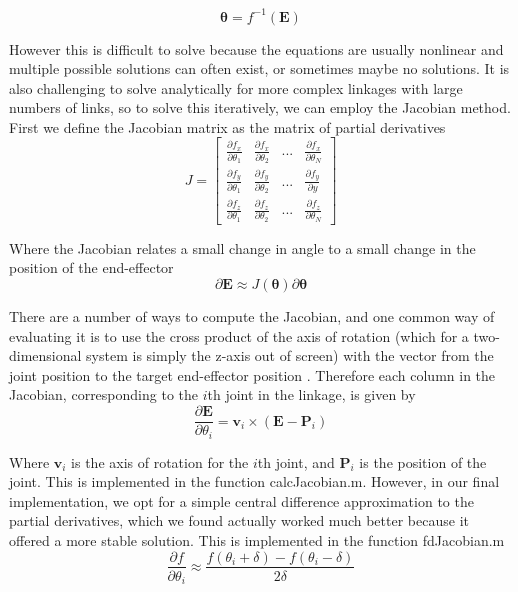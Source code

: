 \documentclass[paper=a4, fontsize=11pt]{scrartcl} %
\numberwithin{equation}{section} %
\numberwithin{figure}{section} %
\numberwithin{table}{section} %
\newcommand{\vect}[1]{\mathbf{#1}}
\newcommand{\params}{\boldsymbol{\theta}}
\newcommand{\dn}[1]{\partial{#1}}
\begin{document}
\begin{equation}
\params = f^{-1}(\vect{E})
\end{equation}

However this is difficult to solve because the equations are usually nonlinear and multiple possible solutions can often exist, or sometimes maybe no solutions. It is also challenging to solve analytically for more complex linkages with large numbers of links, so to solve this iteratively, we can employ the Jacobian method. First we define the Jacobian matrix as the matrix of partial derivatives
\vspace{1mm}
\begin{equation}
J = \left[
\begin{array}{cccc}
\frac{\dn{f_x}}{\dn{\theta_1}} & \frac{\dn{f_x}}{\dn{\theta_2}} & ... & \frac{\dn{f_x}}{\dn{\theta_N}} 
\\[0.2cm]
\frac{\dn{f_y}}{\dn{\theta_1}} & \frac{\dn{f_y}}{\dn{\theta_2}} & ... & \frac{\dn{f_y}}{\dn{y}} 
\\[0.2cm]
\frac{\dn{f_z}}{\dn{\theta_1}} & \frac{\dn{f_z}}{\dn{\theta_2}} & ... & \frac{\dn{f_z}}{\dn{\theta_N}}
\end{array}
\right]
\end{equation}

Where the Jacobian relates a small change in angle to a small change in the position of the end-effector
\vspace{1mm}
\begin{equation}
\partial \vect{E} \approx J(\params) \partial \params
\end{equation}

There are a number of ways to compute the Jacobian, and one common way of evaluating it is to use the cross product of the axis of rotation (which for a two-dimensional system is simply the z-axis out of screen) with the vector from the joint position to the target end-effector position \cite{Buss09}. Therefore each column in the Jacobian, corresponding to the $i$th joint in the linkage, is given by
\vspace{3mm}
\begin{equation}
\frac{\dn{\vect{E}}}{\dn{\theta_i}} = \vect{v}_i \times (\vect{E} - \vect{P}_i)
\end{equation}

Where $\vect{v}_i$ is the axis of rotation for the $i$th joint, and $\vect{P}_i$ is the position of the joint. This is implemented in the function calcJacobian.m. However, in our final implementation, we opt for a simple central difference approximation to the partial derivatives, which we found actually worked much better because it offered a more stable solution. This is implemented in the function fdJacobian.m
\vspace{3mm}
\begin{equation}
\frac{\dn{f}}{\dn{\theta_i}} \approx \frac{f(\theta_i+\delta) - f(\theta_i-\delta)}{2\delta} 
\end{equation}
 
\end{document}

